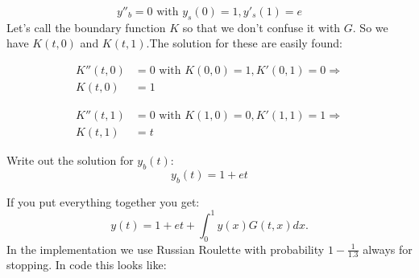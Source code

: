 $$
    y''_{b} = 0 \text{ with } y_{s}(0)=1, y'_{s}(1)= e
$$
Let's call the boundary function $K$ so that we don't confuse it with $G$.
So we have $K(t,0)$ and $K(t,1)$.The solution for these are easily found:

\begin{align*}
    K''(t,0) & = 0 \text{ with } K(0,0)=1, K'(0,1)=0 \Rightarrow \\
    K(t,0)   & =1
\end{align*}

\begin{align*}
    K''(t,1) & =0 \text{ with } K(1,0)=0, K'(1,1)=1 \Rightarrow \\
    K(t,1)   & =t
\end{align*}

Write out the solution for $y_{b}(t)$:
$$
    y_{b}(t) = 1 + e t
$$

If you put everything together you get:
$$
    y(t) = 1+et +\int_{0}^{1} y(x) G(t,x)dx.
$$
In the implementation we use Russian Roulette  with probability $1-\frac{1}{1.3}$ always for stopping.
In code this looks like:

